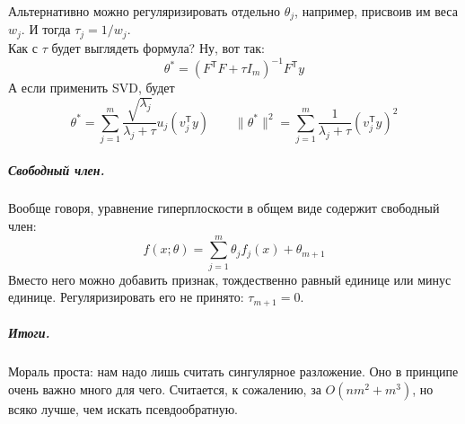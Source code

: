 \documentclass{article}
\begin{document}
    Альтернативно можно регуляризировать отдельно $\theta_j$, например, присвоив им веса $w_j$. И тогда $\tau_j=1/w_j$.\\
    Как с $\tau$ будет выглядеть формула? Ну, вот так:
    \[
    \theta^*=(F^{\mathsf T}F+\tau I_m)^{-1}F^{\mathsf T}y
    \]
    А если применить SVD, будет
    \[
    \theta^*=\sum\limits_{j=1}^m\frac{\sqrt{\lambda_j}}{\lambda_j+\tau}u_j(v_j^{\mathsf T}y)
    \qquad
    \|\theta^*\|^2=\sum\limits_{j=1}^m\frac1{\lambda_j+\tau}(v_j^{\mathsf T}y)^2
    \]
    \subparagraph{Свободный член.}
    Вообще говоря, уравнение гиперплоскости в общем виде содержит свободный член:
    \[
    f(x;\theta)=\sum\limits_{j=1}^m\theta_jf_j(x)+\theta_{m+1}
    \]
    Вместо него можно добавить признак, тождественно равный единице или минус единице. Регуляризировать его не принято: $\tau_{m+1}=0$.
    \subparagraph{Итоги.}
    Мораль проста: нам надо лишь считать сингулярное разложение. Оно в принципе очень важно много для чего. Считается, к сожалению, за $O(nm^2+m^3)$, но всяко лучше, чем искать псевдообратную.
\end{document}
